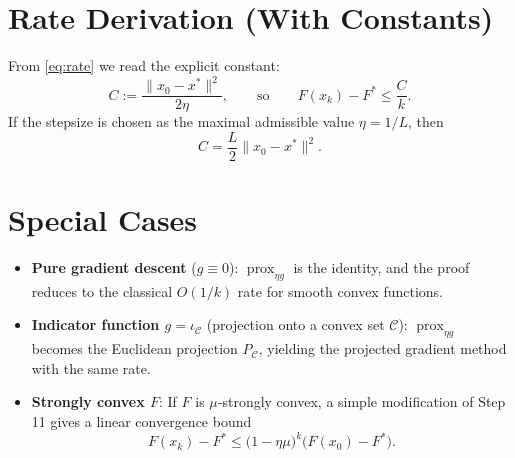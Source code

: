 \documentclass{article}
\begin{document}
\section*{Rate Derivation (With Constants)}
From \eqref{eq:rate} we read the explicit constant:
\[
C:=\frac{\|x_{0}-x^{*}\|^{2}}{2\eta},
\qquad\text{so}\qquad
F(x_{k})-F^{*}\le \frac{C}{k}.
\]
If the stepsize is chosen as the maximal admissible value $\eta=1/L$, then
\[
C=\frac{L}{2}\|x_{0}-x^{*}\|^{2}.
\]

\section*{Special Cases}
\begin{itemize}
\item \textbf{Pure gradient descent} ($g\equiv0$): $\operatorname{prox}_{\eta g}$ is the identity, and the proof reduces to the classical $O(1/k)$ rate for smooth convex functions.
\item \textbf{Indicator function $g=\iota_{\mathcal{C}}$} (projection onto a convex set $\mathcal{C}$): $\operatorname{prox}_{\eta g}$ becomes the Euclidean projection $P_{\mathcal{C}}$, yielding the projected gradient method with the same rate.
\item \textbf{Strongly convex $F$}: If $F$ is $\mu$‑strongly convex, a simple modification of Step 11 gives a linear convergence bound
\[
F(x_{k})-F^{*}\le\bigl(1-\eta\mu\bigr)^{k}\bigl(F(x_{0})-F^{*}\bigr).
\]
\end{itemize}
\end{document}
